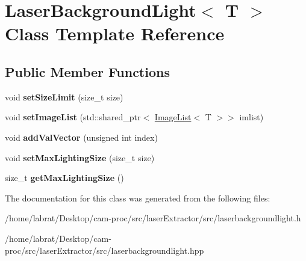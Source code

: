 \hypertarget{classLaserBackgroundLight}{}\section{Laser\+Background\+Light$<$ T $>$ Class Template Reference}
\label{classLaserBackgroundLight}
\subsection*{Public Member Functions}
\begin{DoxyCompactItemize}
\item 
void {\bfseries set\+Size\+Limit} (size\+\_\+t size)\hypertarget{classLaserBackgroundLight_a037d4f561f0f3f9a478d15c4dd4e7ca2}{}\label{classLaserBackgroundLight_a037d4f561f0f3f9a478d15c4dd4e7ca2}

\item 
void {\bfseries set\+Image\+List} (std\+::shared\+\_\+ptr$<$ \hyperlink{classImageList}{Image\+List}$<$ T $>$$>$ imlist)\hypertarget{classLaserBackgroundLight_aebe854e4dca4699599ad49d5ac3d48a0}{}\label{classLaserBackgroundLight_aebe854e4dca4699599ad49d5ac3d48a0}

\item 
void {\bfseries add\+Val\+Vector} (unsigned int index)\hypertarget{classLaserBackgroundLight_ae8ef3881134af33746efa2dae62b71f2}{}\label{classLaserBackgroundLight_ae8ef3881134af33746efa2dae62b71f2}

\item 
void {\bfseries set\+Max\+Lighting\+Size} (size\+\_\+t size)\hypertarget{classLaserBackgroundLight_a01e0df3b8c433b94f280072f43b40097}{}\label{classLaserBackgroundLight_a01e0df3b8c433b94f280072f43b40097}

\item 
size\+\_\+t {\bfseries get\+Max\+Lighting\+Size} ()\hypertarget{classLaserBackgroundLight_a69abe465aa7ac94346998ffab412d37d}{}\label{classLaserBackgroundLight_a69abe465aa7ac94346998ffab412d37d}

\end{DoxyCompactItemize}


The documentation for this class was generated from the following files\+:\begin{DoxyCompactItemize}
\item 
/home/labrat/\+Desktop/cam-\/proc/src/laser\+Extractor/src/laserbackgroundlight.\+h\item 
/home/labrat/\+Desktop/cam-\/proc/src/laser\+Extractor/src/laserbackgroundlight.\+hpp\end{DoxyCompactItemize}
